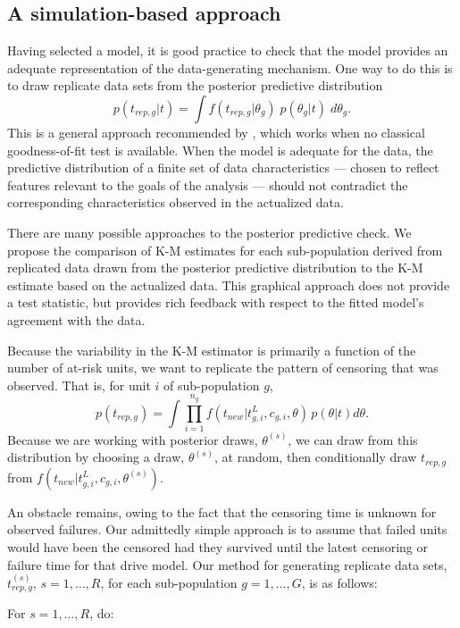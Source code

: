 \documentclass[12pt]{article}
\begin{document}
\subsection{A simulation-based approach}
\label{model-assessment}
Having selected a model, it is good practice to check that the model provides an adequate representation of the data-generating mechanism. One way to do this is to draw replicate data sets from the posterior predictive distribution
$$p(t_{rep,g}|t) = \int f(t_{rep,g}|\theta_g)\; p(\theta_g|t)\;d\theta_g.$$
This is a general approach recommended by \cite{gelman1996postpred}, which works when no classical goodness-of-fit test is available. When the model is adequate for the data, the predictive distribution of a finite set of data characteristics --- chosen to reflect features relevant to the goals of the analysis --- should not contradict the corresponding characteristics observed in the actualized data.

There are many possible approaches to the posterior predictive check. We propose the comparison of K-M estimates for each sub-population derived from replicated data drawn from the posterior predictive distribution to the K-M estimate based on the actualized data. This graphical approach does not provide a test statistic, but provides rich feedback with respect to the fitted model's agreement with the data.

Because the variability in the K-M estimator is primarily a function of the number of at-risk units, we want to replicate the pattern of censoring that was observed. That is, for unit $i$ of sub-population $g$,
$$p(t_{rep,g}) = \int \prod_{i=1}^{n_g}f(t_{new}|t_{g,i}^L,c_{g,i},\theta)\,p(\theta|t)d\theta.$$
Because we are working with posterior draws, $\theta^{(s)}$, we can draw from this distribution by choosing a draw, $\theta^{(s)}$, at random, then conditionally draw $t_{rep,g}$ from $f(t_{new}|t_{g,i}^L,c_{g,i},\theta^{(s)}).$

An obstacle remains, owing to the fact that the censoring time is unknown for observed failures. Our admittedly simple approach is to assume that failed units would have been the censored had they survived until the latest censoring or failure time for that drive model. Our method for generating replicate data sets, $t_{rep,g}^{(s)}$, $s = 1,\ldots, R$, for each sub-population $g=1,\ldots,G$, is as follows:

For $s=1,\ldots, R$, do:
\end{document}
